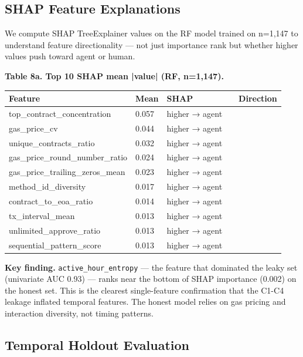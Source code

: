 \documentclass[sigconf,nonacm=false]{acmart}
\begin{document}
\subsection{SHAP Feature Explanations}

We compute SHAP TreeExplainer values on the RF model trained on n=1,147 to understand feature directionality — not just importance rank but whether higher values push toward agent or human.

\textbf{Table 8a. Top 10 SHAP mean |value| (RF, n=1,147).}

\begin{table}[h]
\centering
\small
\begin{tabular}{lllll}
\toprule
Feature & Mean & SHAP &  & Direction \\
\midrule
top\_contract\_concentration & 0.057 & higher → agent &  &  \\
gas\_price\_cv & 0.044 & higher → agent &  &  \\
unique\_contracts\_ratio & 0.032 & higher → agent &  &  \\
gas\_price\_round\_number\_ratio & 0.024 & higher → agent &  &  \\
gas\_price\_trailing\_zeros\_mean & 0.023 & higher → agent &  &  \\
method\_id\_diversity & 0.017 & higher → agent &  &  \\
contract\_to\_eoa\_ratio & 0.014 & higher → agent &  &  \\
tx\_interval\_mean & 0.013 & higher → agent &  &  \\
unlimited\_approve\_ratio & 0.013 & higher → agent &  &  \\
sequential\_pattern\_score & 0.013 & higher → agent &  &  \\
\bottomrule
\end{tabular}
\end{table}

\textbf{Key finding.} \texttt{active\_hour\_entropy} — the feature that dominated the leaky set (univariate AUC 0.93) — ranks near the bottom of SHAP importance (0.002) on the honest set. This is the clearest single-feature confirmation that the C1-C4 leakage inflated temporal features. The honest model relies on gas pricing and interaction diversity, not timing patterns.

\subsection{Temporal Holdout Evaluation}
\end{document}
